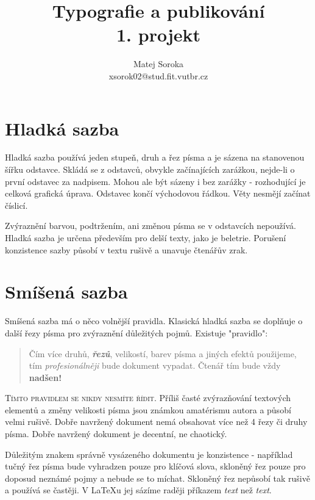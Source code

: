 \documentclass[czech,a4paper,10pt,twocolumn]{article}
\begin{document}
\title{Typografie a publikování\\1. projekt}
\author{Matej Soroka\\xsorok02@stud.fit.vutbr.cz}
\date{}

\maketitle

\section{Hladká sazba}

Hladká sazba používá jeden stupeň, druh a řez písma a je sázena na stanovenou šířku odstavce. Skládá se z odstavců, obvykle začínajících zarážkou, nejde-li o první odstavec za nadpisem. Mohou ale být sázeny i bez zarážky - rozhodující je celková grafická úprava. Odstavec končí východovou řádkou. Věty nesmějí začínat číslicí.

Zvýraznění barvou, podtržením, ani změnou písma se v odstavcích nepoužívá. Hladká sazba je určena především pro delší texty, jako je beletrie. Porušení konzistence sazby působí v textu rušivě a unavuje čtenářův zrak.

\section{Smíšená sazba}

Smíšená sazba má o něco volnější pravidla. Klasická hladká sazba se doplňuje o další řezy písma pro zvýraznění důležitých pojmů. Existuje "pravidlo":

\begin{quotation}Čím více {\ttfamily druhů}, {\bfseries{\itshape řezů}}, velikostí, barev písma a jiných efektů použijeme, tím \emph{profesionálněji} bude dokument vypadat. Čtenář tím { \tiny bude} vždy {\bfseries{\huge nadšen!}}\end{quotation}

{\scshape Tímto pravidlem se nikdy nesmíte řídit}. Příliš časté zvýrazňování textových elementů a změny velikosti písma jsou známkou amatérismu autora a působí velmi rušivě. Dobře navržený dokument nemá obsahovat více než
4 řezy či druhy písma. Dobře navržený dokument je decentní, ne chaotický.

Důležitým znakem správně vysázeného dokumentu je konzistence - například tučný řez písma bude vyhradzen pouze pro klíčová slova, skloněný řez pouze pro doposud neznámé pojmy a nebude se to míchat. Skloněný řez nepůsobí tak rušivě a používá se častěji. V LaTeXu jej sázíme raději příkazem \emph{text} než \textit{text}.
\end{document}
